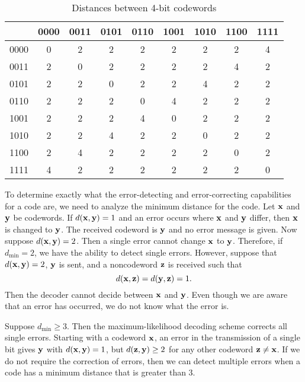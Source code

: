  
\begin{table}[hbt]
\caption{Distances between 4-bit codewords}{\small
\begin{center}
\begin{tabular}{|c|cccccccc|}
\hline
    & 0000 & 0011 & 0101 & 0110 & 1001 & 1010 & 1100 & 1111
\\ \hline
0000 & 0 & 2 & 2 & 2 & 2 & 2 & 2 & 4 \\
0011 & 2 & 0 & 2 & 2 & 2 & 2 & 4 & 2 \\
0101 & 2 & 2 & 0 & 2 & 2 & 4 & 2 & 2 \\
0110 & 2 & 2 & 2 & 0 & 4 & 2 & 2 & 2 \\
1001 & 2 & 2 & 2 & 4 & 0 & 2 & 2 & 2 \\
1010 & 2 & 2 & 4 & 2 & 2 & 0 & 2 & 2 \\
1100 & 2 & 4 & 2 & 2 & 2 & 2 & 0 & 2 \\
1111 & 4 & 2 & 2 & 2 & 2 & 2 & 2 & 0 \\
\hline
\end{tabular}
\end{center}
}
\end{table}
 
 
 
To determine exactly what the error-detecting and error-correcting
capabilities for a code are, we need to analyze the minimum distance
for the code. Let ${\bold x}$ and ${\bold y}$ be codewords. If
$d({\bold x}, {\bold y}) = 1$ and an error occurs where ${\bold x}$
and ${\bold y}$ differ, then ${\bold x}$ is changed to ${\bold y}$.
The received codeword is ${\bold y}$ and no error message is given.
Now suppose $d({\bold x}, {\bold y}) = 2$. Then a single error cannot
change ${\bold x}$ to ${\bold y}$. Therefore, if $d_{\min} = 2$, we
have the ability to detect single errors. However, suppose that
$d({\bold x}, {\bold y}) = 2$, ${\bold y}$ is sent, and a noncodeword
${\bold z}$ is received such that
\[
d({\bold x}, {\bold z}) = d({\bold y}, {\bold z}) = 1.
\]
Then the decoder cannot decide between ${\bold x}$ and ${\bold y}$. Even
though we are aware that an error has occurred, we do not know what
the error is.
 
 
Suppose $d_{\min} \geq 3$. Then the maximum-likelihood decoding scheme
corrects all single errors. Starting with a codeword ${\bold x}$, an
error in the transmission of a single bit gives ${\bold y}$ with
$d({\bold x}, {\bold y}) = 1$, but $d({\bold z}, {\bold y}) \geq 2$
for any other codeword ${\bold z} \neq {\bold x}$. If we do not
require the correction of errors, then we can detect multiple errors
when a code has a minimum distance that is greater than 3.  
 
